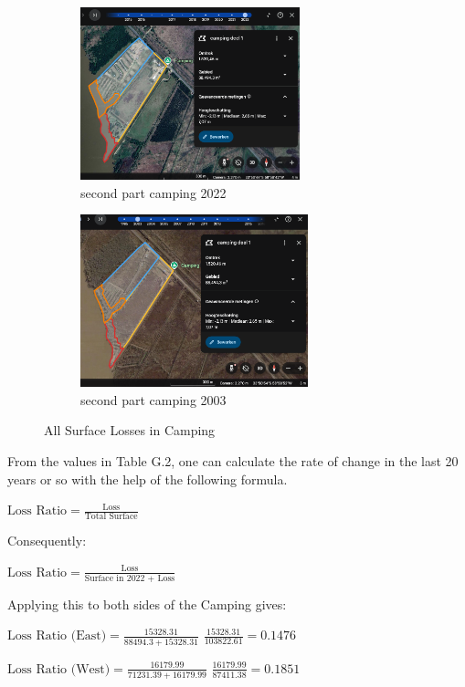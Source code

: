 \begin{figure}[H]
    \begin{subfigure}[b]{0.48\textwidth}
        \includegraphics[width=\linewidth, height =5cm]{figures/appendix-g/delen2022.png}
        \caption{second part camping 2022}
        \label{fig:second}
    \end{subfigure}
    \hfill
    \begin{subfigure}[b]{0.48\textwidth}
        \includegraphics[width=\linewidth, height =5cm]{figures/appendix-g/delen2003.png}
        \caption{second part camping 2003}
        \label{fig:second}
    \end{subfigure}

    \caption{All Surface Losses in Camping }
    \label{fig:All Surface Losses Camping appendix}
\end{figure}

From the values in Table G.2, one can calculate the rate of change in the last 20 years or so with the help of the following formula.

$\text{Loss Ratio} = \frac{\text{Loss}}{\text{Total Surface}}$

Consequently:

$\text{Loss Ratio} = \frac{\text{Loss}}{\text{Surface in 2022 + Loss}}$

Applying this to both sides of the Camping gives:

$\text{Loss Ratio (East)} = \frac{15328.31}{88494.3 + 15328.31}$
$\frac{15328.31}{103822.61} = 0.1476$ 

$\text{Loss Ratio (West)} = \frac{16179.99}{71231.39 + 16179.99}$ 
$\frac{16179.99}{87411.38} = 0.1851 $ 


